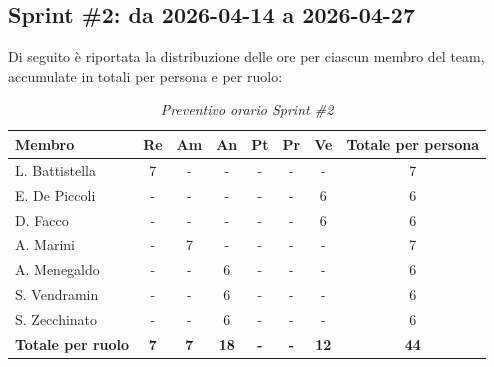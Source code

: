 \documentclass[a4paper, 10pt, colorlinks=true, linkcolor=black, urlcolor=blue, citecolor=blue, hidelinks]{article}
\renewcommand{\arraystretch}{1.2}
\begin{document}
\subsection{Sprint \#2: da 2026-04-14 a 2026-04-27}
Di seguito è riportata la distribuzione delle ore per ciascun membro del team,
accumulate in totali per persona e per ruolo:
\begin{table}[H]
    \centering
    \renewcommand{\arraystretch}{1.4}
    \begin{tabular}{|l|c|c|c|c|c|c|c|}
        \hline
        \rowcolor{bluBitless!15}
        \textbf{Membro} & \textbf{Re} & \textbf{Am} & \textbf{An} & \textbf{Pt} & \textbf{Pr} & \textbf{Ve} & \textbf{Totale per persona} \\
        \hline
        L. Battistella & 7 & - & - & - & - & - & 7 \\ \hline
        E. De Piccoli & - & - & - & - & - & 6 & 6 \\ \hline
        D. Facco & - & - & - & - & - & 6 & 6 \\ \hline
        A. Marini & - & 7 & - & - & - & - & 7 \\ \hline
        A. Menegaldo & - & - & 6 & - & - & - & 6 \\ \hline
        S. Vendramin & - & - & 6 & - & - & - & 6 \\ \hline
        S. Zecchinato & - & - & 6 & - & - & - & 6 \\ \hline
        \rowcolor{bluBitless!8}
        \textbf{Totale per ruolo} & \textbf{7} & \textbf{7} & \textbf{18} & \textbf{-} & \textbf{-} & \textbf{12} & \textbf{44} \\
        \hline
    \end{tabular}
    \caption{\textit{Preventivo orario Sprint \#2}}
\end{table}
\end{document}
